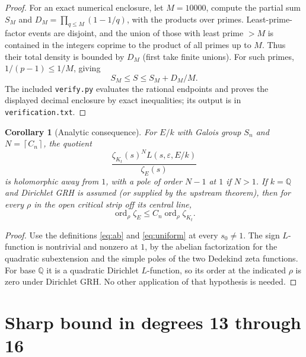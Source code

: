 \documentclass[11pt]{article}
\newtheorem{corollary}[theorem]{Corollary}
\theoremstyle{remark}\newtheorem{remark}[theorem]{Remark}
\newcommand{\ord}{\operatorname{ord}}
\newcommand{\Q}{\mathbb Q}
\newcommand{\sgn}{\varepsilon}
\newcommand{\ceil}[1]{\left\lceil #1\right\rceil}
\begin{document}
\begin{proof}
For an exact numerical enclosure, let $M=10000$, compute the partial sum $S_M$ and $D_M=\prod_{q\le M}(1-1/q)$, with the products over primes. Least-prime-factor events are disjoint, and the union of those with least prime $>M$ is contained in the integers coprime to the product of all primes up to $M$. Thus their total density is bounded by $D_M$ (first take finite unions). For such primes, $1/(p-1)\le1/M$, giving
\[
 S_M\le S\le S_M+D_M/M.
\]
The included \texttt{verify.py} evaluates the rational endpoints and proves the displayed decimal enclosure by exact inequalities; its output is in \texttt{verification.txt}.
\end{proof}

\begin{corollary}[Analytic consequence]\label{cor:analytic}
For $E/k$ with Galois group $S_n$ and $N=\ceil{C_n}$, the quotient
\[
 \frac{\zeta_{K_t}(s)^N L(s,\sgn,E/k)}{\zeta_E(s)}
\]
is holomorphic away from $1$, with a pole of order $N-1$ at $1$ if $N>1$. If $k=\Q$ and Dirichlet GRH is assumed (or supplied by the upstream theorem), then for every $\rho$ in the open critical strip off its central line,
\[
 \ord_\rho\zeta_E\le C_n\ord_\rho\zeta_{K_t}.
\]
\end{corollary}
\begin{proof}
Use the definitions \eqref{eq:ab} and \eqref{eq:uniform} at every $s_0\ne1$. The sign $L$-function is nontrivial and nonzero at $1$, by the abelian factorization for the quadratic subextension and the simple poles of the two Dedekind zeta functions. For base $\Q$ it is a quadratic Dirichlet $L$-function, so its order at the indicated $\rho$ is zero under Dirichlet GRH. No other application of that hypothesis is needed.
\end{proof}

\section{Sharp bound in degrees 13 through 16}
\end{document}
